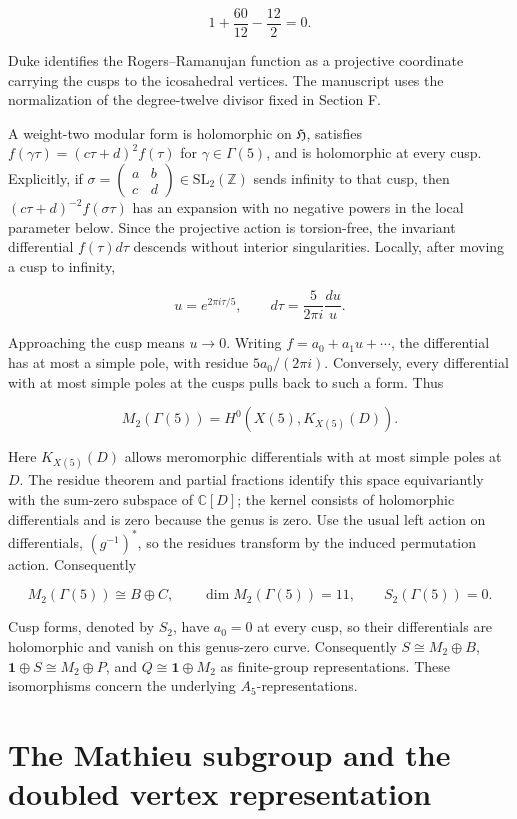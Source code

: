 \documentclass[11pt,a4paper]{article}
\begin{document}
\[
1+\frac{60}{12}-\frac{12}{2}=0.
\]

Duke \citep[Sections 3 and 6]{Duke2005} identifies the Rogers--Ramanujan function as a projective coordinate carrying the cusps to the icosahedral vertices. The manuscript uses the normalization of the degree-twelve divisor fixed in Section F.

A weight-two modular form is holomorphic on $\mathfrak H$, satisfies $f(\gamma\tau)=(c\tau+d)^2f(\tau)$ for $\gamma\in\Gamma(5)$, and is holomorphic at every cusp. Explicitly, if $\sigma=\left(\begin{smallmatrix}a&b\\c&d\end{smallmatrix}\right)\in\mathrm{SL}_2(\mathbb Z)$ sends infinity to that cusp, then $(c\tau+d)^{-2}f(\sigma\tau)$ has an expansion with no negative powers in the local parameter below. Since the projective action is torsion-free, the invariant differential $f(\tau)d\tau$ descends without interior singularities. Locally, after moving a cusp to infinity,

\[
u=e^{2\pi i\tau/5},\qquad d\tau=\frac5{2\pi i}\frac{du}{u}.
\]

Approaching the cusp means $u\to0$. Writing $f=a_0+a_1u+\cdots$, the differential has at most a simple pole, with residue $5a_0/(2\pi i)$. Conversely, every differential with at most simple poles at the cusps pulls back to such a form. Thus

\[
M_2(\Gamma(5))=H^0(X(5),K_{X(5)}(D)).
\]

Here $K_{X(5)}(D)$ allows meromorphic differentials with at most simple poles at $D$. The residue theorem and partial fractions identify this space equivariantly with the sum-zero subspace of \(\mathbb C[D]\); the kernel consists of holomorphic differentials and is zero because the genus is zero. Use the usual left action on differentials, \((g^{-1})^*\), so the residues transform by the induced permutation action. Consequently

\[
M_2(\Gamma(5))\cong B\oplus C,\qquad
\dim M_2(\Gamma(5))=11,\qquad S_2(\Gamma(5))=0.
\]

Cusp forms, denoted by $S_2$, have $a_0=0$ at every cusp, so their differentials are holomorphic and vanish on this genus-zero curve. Consequently \(S\cong M_2\oplus B\), \(\mathbf1\oplus S\cong M_2\oplus P\), and \(Q\cong\mathbf1\oplus M_2\) as finite-group representations. These isomorphisms concern the underlying \(A_5\)-representations.

\section{The Mathieu subgroup and the doubled vertex representation}\label{sec:conformal}
\end{document}
